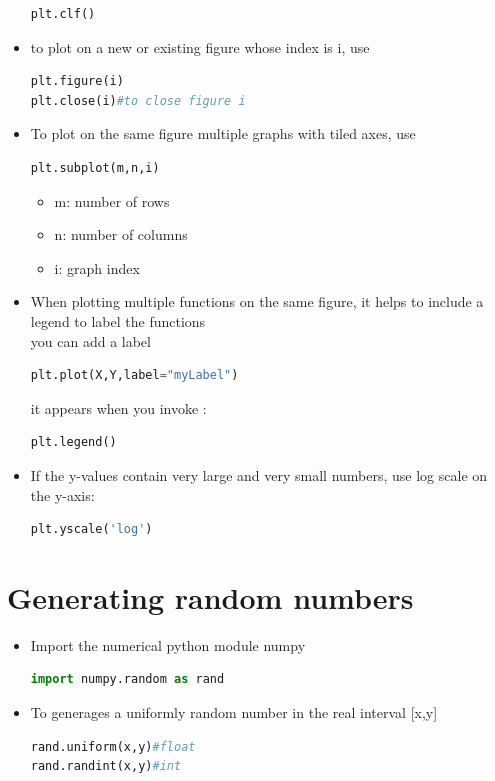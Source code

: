 \documentclass[12pt,oneside]{book}
\begin{document}
\begin{itemize}
\begin{lstlisting}[language=python]
plt.clf()
\end{lstlisting}
	\item to plot on a new or existing figure whose index is i, use
\begin{lstlisting}[language=python]
plt.figure(i)
plt.close(i)#to close figure i
\end{lstlisting}
	\item To plot on the same figure multiple graphs with tiled axes, use
\begin{lstlisting}[language=python]
plt.subplot(m,n,i)
\end{lstlisting}
	      \begin{itemize}
		      \item m: number of rows
		      \item n: number of columns
		      \item i: graph index
	      \end{itemize}
	\item When plotting multiple functions on the same figure, it helps to include a legend to label the functions\\
	      you can add a label
\begin{lstlisting}[language=python]
plt.plot(X,Y,label="myLabel")
\end{lstlisting}
	it appears when you invoke :
\begin{lstlisting}[language=python]
plt.legend()
\end{lstlisting}
	\item If the y-values contain very large and very small numbers, use log scale on the y-axis:
\begin{lstlisting}[language=python]
plt.yscale('log')
\end{lstlisting}
\end{itemize}
\section{Generating random numbers}
\begin{itemize}
	\item Import the numerical python module numpy
\begin{lstlisting}[language=python]
import numpy.random as rand
\end{lstlisting}
	\item To generages a uniformly random number in the real interval [x,y]
\begin{lstlisting}[language=python]
rand.uniform(x,y)#float 
rand.randint(x,y)#int
\end{lstlisting}
\end{itemize}
\end{document}
